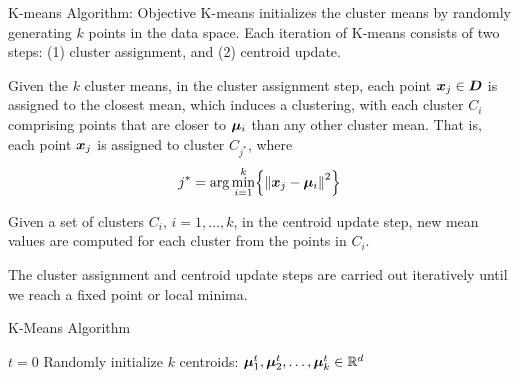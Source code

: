 \begin{frame}{K-means Algorithm: Objective}
K-means initializes the cluster means by randomly generating $k$
points in the data space. 
Each iteration of K-means consists of two steps: (1) cluster
assignment, and (2) centroid update. 

\medskip
Given the $k$ cluster means,
in the cluster assignment step, each point ${\boldsymbol x}_{j} \in {\boldsymbol D}$ is
assigned to the closest mean, which induces a clustering, with
each cluster $C_i$ comprising points that are closer to ${\bm \mu}_i$
than any other cluster mean. That is, each point ${\boldsymbol x}_{j}$ is
assigned to cluster $C_{j^*}$, where
\begin{align*}
j^* = \arg \min_{i=1}^k \Bigl\{\left\lVert{\boldsymbol x}_{j} - {\bm \mu}_i\right\rVert^2\Bigr\}
\end{align*}

\medskip
Given a set of clusters $C_i$, $i=1,\dots,k$, in the centroid
update step, new mean values are computed for each
cluster from the points in $C_i$.

\medskip
The cluster assignment and centroid update
steps are
carried out iteratively until we reach a f\/{i}xed point or local
minima. 
\end{frame}


\begin{frame}[fragile]{K-Means Algorithm}
\begin{tightalgo}[H]{\textwidth-18pt}
\Algorithm{}
$t = 0$\;
Randomly initialize $k$ centroids: ${\bm \mu}_1^t, {\bm \mu}_2^t, \dots,
{\bm \mu}_k^t \in {\mathord{\mathbb R}}^d$\;
\end{tightalgo}
\end{frame}


